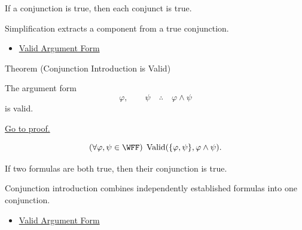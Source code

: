 \begin{remark*}[Interpretation]
If a conjunction is true, then each conjunct is true.

Simplification extracts a component from a true conjunction.
\end{remark*}

\begin{dependencies}
\begin{itemize}
  \item \hyperref[def:valid-argument-form-propositional-logic]{Valid Argument Form}
\end{itemize}
\end{dependencies}

\begin{theorembox}{Theorem (Conjunction Introduction is Valid)}
\begin{theorem}
\label{thm:conjunction-introduction-validity-propositional-logic}
The argument form
\[
\varphi,\qquad \psi \quad\therefore\quad \varphi\land\psi
\]
is valid.

\noindent\hyperref[prf:conjunction-introduction-validity-propositional-logic]{Go to proof.}
\end{theorem}
\end{theorembox}

\begin{remark*}
\[
(\forall\varphi,\psi\in\WFF)\;\operatorname{Valid}(\{\varphi,\psi\},\varphi\land\psi).
\]
\end{remark*}



\begin{remark*}[Interpretation]
If two formulas are both true, then their conjunction is true.

Conjunction introduction combines independently established formulas into one conjunction.
\end{remark*}

\begin{dependencies}
\begin{itemize}
  \item \hyperref[def:valid-argument-form-propositional-logic]{Valid Argument Form}
\end{itemize}
\end{dependencies}

